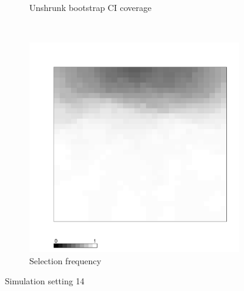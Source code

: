 \documentclass[authoryear, review, 11pt]{elsarticle}
\begin{document}
\begin{figure}
\begin{subfigure}[b]{0.45\textwidth}
		\caption{Unshrunk bootstrap CI coverage}
	\end{subfigure}%
	~ %
	\begin{subfigure}[b]{0.45\textwidth}
	\centering
		\includegraphics[width=\textwidth]{../../figures/simulation/X1.15.14.selection.pdf}
		\caption{Selection frequency}
	\end{subfigure}
	\caption{Simulation setting 14}
\end{figure}
\end{document}
